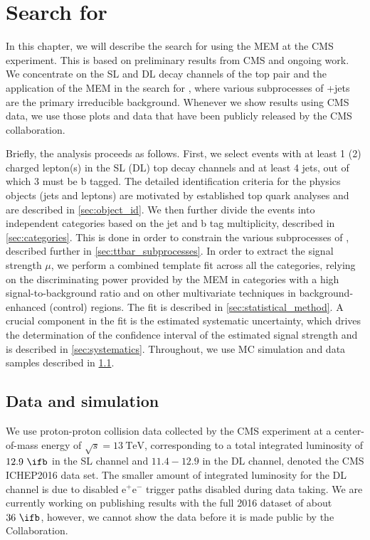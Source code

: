 \section{Search for \ttHbb}

In this chapter, we will describe the search for \ttHbb using the MEM at the CMS experiment. This is based on preliminary results from CMS\cite{CMS-PAS-HIG-16-038} and ongoing work. We concentrate on the SL and DL decay channels of the top pair and the application of the MEM in the search for \ttHbb, where various subprocesses of \ttbar+jets are the primary irreducible background. Whenever we show results using CMS data, we use those plots and data that have been publicly released by the CMS collaboration.

Briefly, the analysis proceeds as follows. First, we select events with at least 1 (2) charged lepton(s) in the SL (DL) top decay channels and at least 4 jets, out of which 3 must be b tagged. The detailed identification criteria for the physics objects (jets and leptons) are motivated by established top quark analyses and are described in \cref{sec:object_id}. We then further divide the events into independent categories based on the jet and b tag multiplicity, described in \cref{sec:categories}. This is done in order to constrain the various subprocesses of \ttbar, described further in \cref{sec:ttbar_subprocesses}. In order to extract the signal strength $\mu$, we perform a combined template fit across all the categories, relying on the discriminating power provided by the MEM in categories with a high signal-to-background ratio and on other multivariate techniques in background-enhanced (control) regions. The fit is described in \cref{sec:statistical_method}.
A crucial component in the fit is the estimated systematic uncertainty, which drives the determination of the confidence interval of the estimated signal strength and is described in \cref{sec:systematics}. Throughout, we use MC simulation and data samples described in \cref{sec:data_mc}.

\subsection{Data and simulation}
\label{sec:data_mc}

We use proton-proton collision data collected by the CMS experiment at a center-of-mass energy of $\sqrt{s} = 13~\mathrm{TeV}$, corresponding to a total integrated luminosity of $12.9~\ifb$ in the SL channel and $11.4-12.9$ in the DL channel, denoted the CMS ICHEP2016 data set. The smaller amount of integrated luminosity for the DL channel is due to disabled $\mathrm{e}^+\mathrm{e}^-$ trigger paths disabled during data taking. We are currently working on publishing results with the full 2016 dataset of about $36~\ifb$, however, we cannot show the data before it is made public by the Collaboration.

